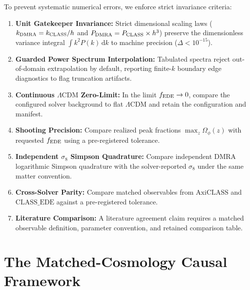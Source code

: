 \documentclass[11pt]{article}
\newcommand{\dd}{\,\mathrm d}
\begin{document}
To prevent systematic numerical errors, we enforce strict invariance criteria:
\begin{enumerate}
\item \textbf{Unit Gatekeeper Invariance:} Strict dimensional scaling laws ($k_{\rm DMRA} = k_{\rm CLASS}/h$ and $P_{\rm DMRA} = P_{\rm CLASS} \times h^3$) preserve the dimensionless variance integral $\int k^2 P(k)\dd k$ to machine precision ($\Delta < 10^{-15}$).
\item \textbf{Guarded Power Spectrum Interpolation:} Tabulated spectra reject out-of-domain extrapolation by default, reporting finite-$k$ boundary edge diagnostics to flag truncation artifacts.
\item \textbf{Continuous $\Lambda\mathrm{CDM}$ Zero-Limit:} In the limit $f_{\rm EDE} \to 0$, compare the configured solver background to flat $\Lambda\mathrm{CDM}$ and retain the configuration and manifest.
\item \textbf{Shooting Precision:} Compare realized peak fractions $\max_z \Omega_\phi(z)$ with requested $f_{\rm EDE}$ using a pre-registered tolerance.
\item \textbf{Independent $\sigma_8$ Simpson Quadrature:} Compare independent DMRA logarithmic Simpson quadrature with the solver-reported $\sigma_8$ under the same matter convention.
\item \textbf{Cross-Solver Parity:} Compare matched observables from $\text{AxiCLASS}$ and $\text{CLASS\_EDE}$ against a pre-registered tolerance.
\item \textbf{Literature Comparison:} A literature agreement claim requires a matched observable definition, parameter convention, and retained comparison table.
\end{enumerate}

\section{The Matched-Cosmology Causal Framework}
\label{sec:matched_framework}
\end{document}
